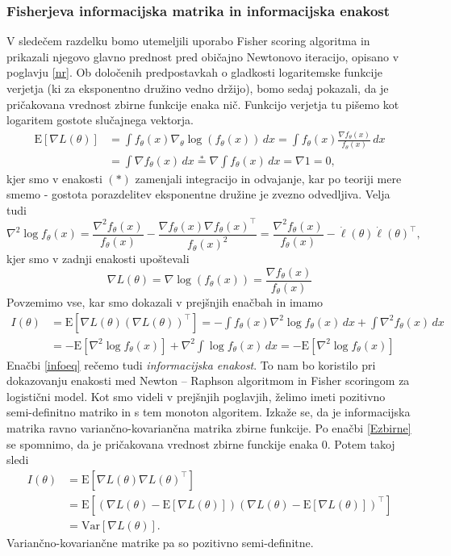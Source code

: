 \documentclass[12pt,a4paper]{amsart}
\theoremstyle{definition} %
\theoremstyle{plain} %
\begin{document}
\subsubsection{Fisherjeva informacijska matrika in informacijska enakost}
V sledečem razdelku bomo utemeljili uporabo Fisher scoring algoritma in prikazali njegovo glavno prednost pred običajno Newtonovo iteracijo, opisano v poglavju \ref{nr}.
Ob določenih predpostavkah o gladkosti logaritemske funkcije verjetja (ki za eksponentno družino vedno držijo), bomo sedaj pokazali, da je pričakovana vrednost
zbirne funkcije enaka nič. Funkcijo verjetja tu pišemo kot logaritem gostote slučajnega vektorja.
\begin{align} \label{Ezbirne}
    \mathrm{E}[\nabla L (\theta)] &= \int f_{\theta}(x) \nabla_{\theta}\log(f_{\theta}(x)) \,dx = \int f_{\theta}(x) \frac{\nabla f_{\theta}(x)}{f_{\theta}(x)} \,dx \nonumber \\
        &= \int \nabla f_{\theta}(x) \,dx \overset{*}{=} \nabla \int f_{\theta}(x) \,dx = \nabla 1 = 0, 
\end{align}
kjer smo v enakosti $(*)$ zamenjali integracijo in odvajanje, kar po teoriji mere smemo - gostota porazdelitev eksponentne družine je zvezno odvedljiva. 
Velja tudi
\[
    \nabla^{2} \log{f_{\theta}(x)} = \frac{\nabla^2 f_{\theta}(x)}{f_{\theta}(x)} - \frac{\nabla f_{\theta}(x) \nabla f_{\theta}(x)^\top }{f_{\theta}(x)^{2}} = 
    \frac{\nabla^2 f_{\theta}(x)}{f_{\theta}(x)} - \dot{\ell}(\theta)\dot{\ell}(\theta)^\top,
\]
kjer smo v zadnji enakosti upoštevali
\[
    \nabla L (\theta) = \nabla \log(f_{\theta}(x)) = \frac{\nabla f_{\theta}(x)}{f_{\theta}(x)} 
\]
Povzemimo vse, kar smo dokazali v prejšnjih enačbah in imamo
\begin{align}\label{infoeq}
    I(\theta) &= \mathrm{E}[\nabla L(\theta)(\nabla L(\theta))^\top] =  -\int f_{\theta}(x) \nabla^2 \log f_{\theta}(x) \,dx+ \int \nabla^2 f_{\theta}(x) \,dx \nonumber \\
    &= -\mathrm{E}[\nabla^2 \log f_{\theta}(x)] + \nabla^2\int \log f_{\theta}(x) \,dx = -\mathrm{E}[\nabla^2 \log f_{\theta}(x)]
\end{align}
Enačbi \eqref{infoeq} rečemo tudi \textit{informacijska enakost}. To nam bo koristilo pri dokazovanju enakosti med Newton -- Raphson algoritmom in Fisher scoringom za logistični model.
Kot smo videli v prejšnjih poglavjih, želimo imeti pozitivno semi-definitno matriko in s tem monoton algoritem. Izkaže se, da je informacijska matrika ravno variančno-kovariančna matrika
zbirne funkcije. Po enačbi \eqref{Ezbirne} se spomnimo, da je pričakovana vrednost zbirne funckije enaka 0. Potem takoj sledi
\begin{align}
    I(\theta) &= \mathrm{E}[\nabla L(\theta)\nabla L(\theta)^\top] \nonumber\\
    &= \mathrm{E}[\left(\nabla L(\theta) - \mathrm{E}[\nabla L(\theta)]\right)\left(\nabla L(\theta) - \mathrm{E}[\nabla L(\theta)]\right)^\top] \nonumber \\
    &= \mathrm{Var}[\nabla L(\theta)].
\end{align}
Variančno-kovariančne matrike pa so pozitivno semi-definitne.
\end{document}
